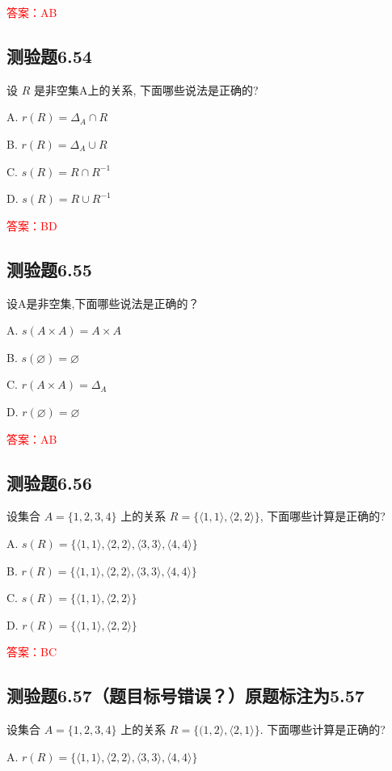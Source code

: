 \documentclass[UTF8, heading=true]{ctexart}
\begin{document}
\textcolor{red}{答案：AB}


\subsection{测验题6.54}
设 $R$ 是非空集A上的关系, 下面哪些说法是正确的?

A. $r(R)=\Delta_A \cap R$

B. $r(R)=\Delta_A \cup R$

C. $s(R)=R \cap R^{-1}$

D. $s(R)=R \cup R^{-1}$

\textcolor{red}{答案：BD}

\subsection{测验题6.55}
设A是非空集,下面哪些说法是正确的？

A. $s(A \times A)=A \times A$

B. $s(\varnothing)=\varnothing$

C. $r(A \times A)=\Delta_A$

D. $r(\varnothing)=\varnothing$

\textcolor{red}{答案：AB}

\subsection{测验题6.56}

设集合 $A=\{1,2,3,4\}$ 上的关系 $R=\{\langle 1,1\rangle,\langle 2,2\rangle\}$, 下面哪些计算是正确的?

A. $s(R)=\{\langle 1,1\rangle,\langle 2,2\rangle,\langle 3,3\rangle,\langle 4,4\rangle\}$

B. $r(R)=\{\langle 1,1\rangle,\langle 2,2\rangle,\langle 3,3\rangle,\langle 4,4\rangle\}$

C. $s(R)=\{\langle 1,1\rangle,\langle 2,2\rangle\}$

D. $r(R)=\{\langle 1,1\rangle,\langle 2,2\rangle\}$

\textcolor{red}{答案：BC}

\subsection{测验题6.57（题目标号错误？）原题标注为5.57}
设集合 $A=\{1,2,3,4\}$ 上的关系 $R=\{(1,2\rangle,\langle 2,1\rangle\}$. 下面哪些计算是正确的?

A. 
$
r(R)=\{\langle 1,1\rangle,\langle 2,2\rangle,\langle 3,3\rangle,\langle 4,4\rangle\}
$
\end{document}
